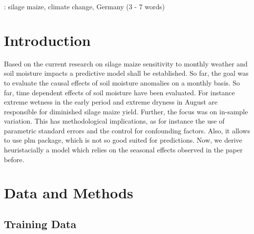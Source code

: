 \documentclass[12pt]{iopart}
\begin{document}
: silage maize, climate change, Germany (3 - 7 words)


\submitto{\ERL}
\maketitle


\section{Introduction}
Based on the current research on silage maize sensitivity to monthly weather and soil moisture impacts  a predictive model shall be established.  So far, the goal was to evaluate the causal effects of soil moisture anomalies on a monthly basis. So far, time dependent effects of soil moisture have been evaluated. For instance extreme wetness in the early period and extreme dryness in August are responsible for diminished silage maize yield.  Further, the focus was on in-sample variation. This has methodological implications, as for instance the use of parametric standard errors and the control for confounding factors. Also, it allows to use plm package, which is not so good suited for predictions. 
Now, we derive heuristacially a model which relies on the seasonal effects observed in the paper before. 

\section{Data and Methods}
\subsection{Training Data}
\end{document}

